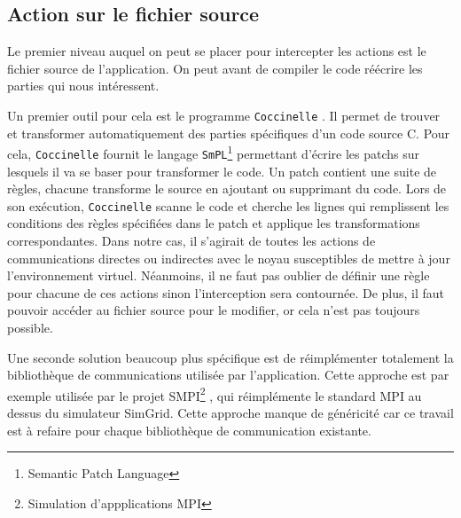\subsection{Action sur le fichier source}
\label{subsection:source}
Le premier niveau auquel on peut se placer pour intercepter les actions est le fichier source de l'application. On peut avant de compiler le code réécrire les parties qui nous intéressent.

Un premier outil pour cela est le programme \texttt{Coccinelle} \citep{cocci}. Il permet de trouver et transformer automatiquement des parties spécifiques d'un code source C. Pour cela, \texttt{Coccinelle} fournit le langage \texttt{SmPL}\footnote{Semantic Patch Language} permettant d'écrire les patchs sur lesquels il va se baser pour transformer le code. Un patch contient une suite de règles, chacune transforme le source en ajoutant ou supprimant du code. Lors de son exécution, \texttt{Coccinelle} scanne le code et cherche les lignes qui remplissent les conditions des règles spécifiées dans le patch et applique les transformations correspondantes. Dans notre cas, il s'agirait de toutes les actions de communications directes ou indirectes avec le noyau susceptibles de mettre à jour l'environnement virtuel. Néanmoins, il ne faut pas oublier de définir une règle pour chacune de ces actions sinon l'interception sera contournée. De plus, il faut pouvoir accéder au fichier source pour le modifier, or cela n'est pas toujours possible.

Une seconde solution beaucoup plus spécifique est de réimplémenter totalement la bibliothèque de communications utilisée par l'application. Cette approche est par exemple utilisée par le projet SMPI\footnote{Simulation d'appplications MPI} \citep{SMPI, clauss2011single}, qui réimplémente le standard MPI au dessus du simulateur SimGrid. Cette approche manque de  généricité car ce travail est à refaire pour chaque bibliothèque de communication existante. 

